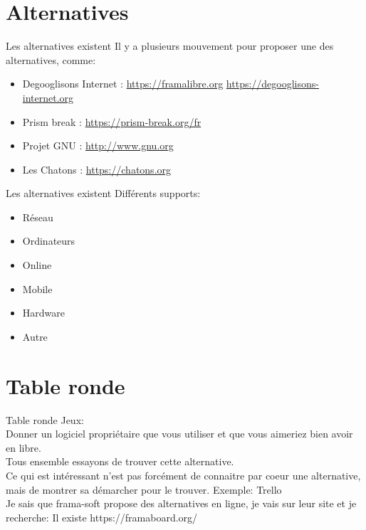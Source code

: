 \documentclass{beamer}
\begin{document}

\section{Alternatives}
\begin{frame}{Les alternatives existent}
Il y a plusieurs mouvement pour proposer une des alternatives, comme:
\begin{itemize}
	\item Degooglisons Internet : \url{https://framalibre.org} \url{https://degooglisons-internet.org}
	\item Prism break : \url{https://prism-break.org/fr}
	\item Projet GNU : \url{http://www.gnu.org}
	\item Les Chatons : \url{https://chatons.org}
\end{itemize}
\end{frame}

\begin{frame}{Les alternatives existent}
Différents supports:
\begin{itemize}
	\item Réseau
	\item Ordinateurs
	\item Online
	\item Mobile
	\item Hardware
	\item Autre
\end{itemize}
\end{frame}




\section{Table ronde}
\begin{frame}{Table ronde}
Jeux:\\
	Donner un logiciel propriétaire que vous utiliser et que vous aimeriez bien avoir en libre.\\
	Tous ensemble essayons de trouver cette alternative.\\
	Ce qui est intéressant n'est pas forcément de connaitre par coeur une alternative, mais de montrer sa démarcher pour le trouver.\newline
	\newline
	Exemple: Trello\\
	Je sais que frama-soft propose des alternatives en ligne, je vais sur leur site et je recherche: Il existe https://framaboard.org/
\end{frame}
\end{document}
